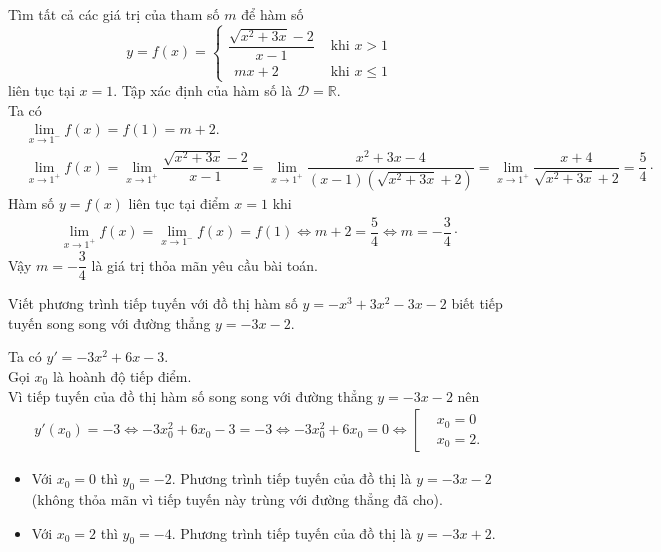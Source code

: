 \begin{bt}%
 Tìm tất cả các giá trị của tham số $m$ để hàm số $$y = f(x) = \begin{cases} \dfrac{\sqrt{x^2+3x}-2}{x-1} & \text{ khi } x>1 \\ \ \  mx+2 & \text{ khi } x\leq 1 \end{cases}$$
 liên tục tại $x = 1$.
 \loigiai
 {
 Tập xác định của hàm số là $\mathscr{D} = \mathbb{R}$.\\
 Ta có
 \allowdisplaybreaks
 \begin{align*}
  & \lim\limits_{x \to 1^-}f(x) = f(1) = m + 2. \\
  & \lim\limits_{x \to 1^+}f(x) = \lim\limits_{x \to 1^+}\dfrac{\sqrt{x^2 + 3x} - 2}{x - 1} = \lim\limits_{x \to 1^+} \dfrac{x^2 + 3x - 4}{(x - 1)\left( \sqrt{x^2+3x}+2 \right)} = \lim\limits_{x \to 1^+}\dfrac{x+4}{\sqrt{x^2+3x}+2} = \dfrac{5}{4}\cdot
 \end{align*}
 Hàm số $y = f(x)$ liên tục tại điểm $x = 1$ khi
 \begin{align*}
  \lim\limits_{x \to 1^+}f(x) = \lim\limits_{x \to 1^-}f(x) = f(1) \Leftrightarrow m + 2 = \dfrac{5}{4} \Leftrightarrow m = -\dfrac{3}{4}\cdot
 \end{align*}
 Vậy $m = -\dfrac{3}{4}$ là giá trị thỏa mãn yêu cầu bài toán.
 }
\end{bt}


\begin{bt}%
 Viết phương trình tiếp tuyến với đồ thị hàm số $y = -x^3+3x^2-3x-2$ biết tiếp tuyến song song với đường thẳng $y = -3x-2$.
 \loigiai
 {
 Ta có $y' = -3x^2 + 6x - 3$.\\
 Gọi $x_0$ là hoành độ tiếp điểm.\\
 Vì tiếp tuyến của đồ thị hàm số song song với đường thẳng $y = -3x-2$ nên
 \begin{align*}
  y'(x_0) = -3 \Leftrightarrow -3x_0^2 + 6x_0 - 3 = - 3 \Leftrightarrow -3x_0^2 + 6x_0 = 0 \Leftrightarrow \left[\begin{aligned}& x_0 = 0 \\& x_0 = 2. \end{aligned}\right.
 \end{align*}
 \begin{itemize}
  \item Với $x_0 = 0$ thì $y_0 = -2$. Phương trình tiếp tuyến của đồ thị là $y = -3x-2$ (không thỏa mãn vì tiếp tuyến này trùng với đường thẳng đã cho).
  \item Với $x_0 = 2$ thì $y_0 = -4$. Phương trình tiếp tuyến của đồ thị là $y = -3x+2$.
 \end{itemize}
 }
\end{bt}


